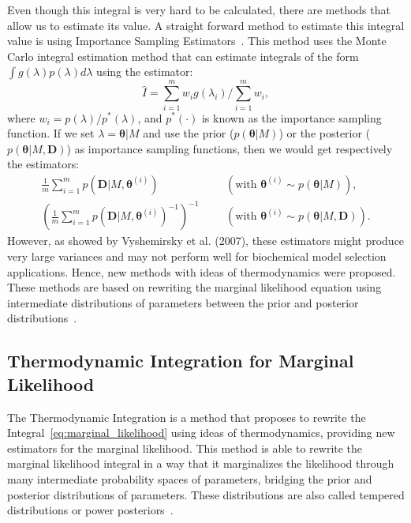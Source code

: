 Even though this integral is very hard to be calculated, there are 
methods that allow us to estimate its value. A straight forward method 
to estimate this integral value is using Importance Sampling 
Estimators~\cite{Newton1993}. This method uses the Monte Carlo integral 
estimation method that can estimate integrals of the form 
$\int g(\lambda) p(\lambda)d\lambda$ using the estimator:
\begin{equation*}
    \hat{I} = \sum_{i = 1}^m w_i g(\lambda_i) / \sum_{i = 1}^m w_i,
\label{eq:importance_sampling_estimator}
\end{equation*}
where $w_i = p (\lambda) / p^* (\lambda)$, and $p^*(\cdot)$ is known as 
the importance sampling function. If we set $\lambda = {\bm\theta} | M$ 
and use the prior ($p({\bm \theta} | M)$) or the posterior ($p({\bm
\theta} | M, {\bm D})$) as importance sampling functions, then we would
get respectively the estimators:
\begin{equation*}
\begin{aligned}
    \frac{1}{m} \sum_{i = 1}^m p({\bm D}|M, {\bm \theta}^{(i)}) &&& 
        (\text{with } {\bm \theta}^{(i)} \sim p({\bm \theta}|M)), \\
    \left(\frac{1}{m} \sum_{i = 1}^m p({\bm D}|M, 
            {\bm \theta}^{(i)})^{-1} \right)^{-1} &&&
        (\text{with } {\bm \theta}^{(i)} \sim p({\bm \theta}|M, 
            {\bm D})).
\end{aligned}
\end{equation*}
However, as showed by Vyshemirsky et al. (2007), these estimators might
produce very large variances and may not perform well for biochemical
model selection applications. Hence, new methods with ideas of 
thermodynamics were proposed. These methods are based on rewriting the
marginal likelihood equation using intermediate distributions of 
parameters between the prior and posterior 
distributions~\cite{Friel2008}.

\label{sec:thermodynamic_integration}
\subsection{Thermodynamic Integration for Marginal Likelihood}
The Thermodynamic Integration is a method that proposes to rewrite
the Integral~\ref{eq:marginal_likelihood} using ideas of thermodynamics,
providing new estimators for the marginal likelihood. This method is
able to rewrite the marginal likelihood integral in a way that it 
marginalizes the likelihood through many intermediate probability spaces 
of parameters, bridging the prior and posterior distributions of 
parameters. These distributions are also called tempered distributions
or power posteriors~\cite{Friel2008}.


